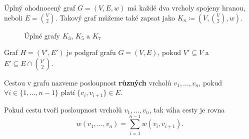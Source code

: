 \begin{definition}
  \label{definice:uplny_ohodnoceny_graf}
  Úplný ohodnocený graf $G = (V, E, w)$ má kaž\-dé dva vrcholy spojeny hranou, neboli $E = \binom{V}{2}$. Takový graf můžeme také zapsat jako $K_n \coloneqq (V,\binom{V}{2},w)$.
  \begin{figure}[H]
    \centering
    \begin{subfigure}[b]{0.3\textwidth}
      \centering
    \end{subfigure}
    \begin{subfigure}[b]{0.3\textwidth}
      \centering
    \end{subfigure}
    \begin{subfigure}[b]{0.3\textwidth}
      \centering
    \end{subfigure}
    \caption{Úplné grafy $K_3$, $K_5$ a $K_7$}
    \label{obr:uplne_ohodnocene_grafy}
  \end{figure}
\end{definition}

\begin{definition}[Podgraf]
  \label{definice:podgraf}
  Graf $H = (V', E')$ je podgraf grafu $G = (V, E)$, pokud $V' \subseteq V$ a $E' \subseteq E \cap \binom{V'}{2}$.
\end{definition}

\begin{definition}[Cesta]
  \label{definice:cesta}
  Cestou v grafu nazveme posloupnost \textbf{různých} vrcholů $v_1, \ldots, v_n$, pokud $\forall i \in \{1,\ldots, n-1\}$ platí $\{v_i, v_{i+1}\} \in E$.
\end{definition}

\begin{definition}
  \label{definice:vaha_cesty}
  Pokud cestu tvoří posloupnost vrcholů $v_1, \ldots, v_n$, tak váha cesty je rovna \[ w(v_1,\dots ,v_n) = \sum_{i=1}^{n-1}w(v_i, v_{i+1}). \]

\end{definition}

